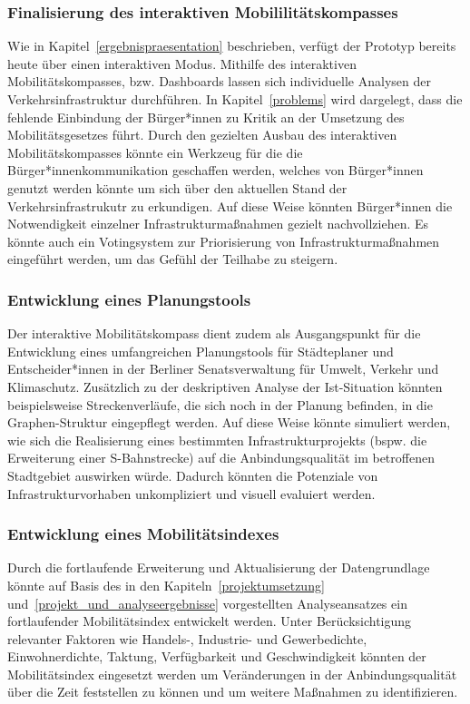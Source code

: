 \subsubsection{Finalisierung des interaktiven Mobililitätskompasses}
Wie in Kapitel~\ref{ergebnispraesentation} beschrieben, verfügt der Prototyp bereits heute über einen interaktiven Modus. Mithilfe des interaktiven Mobilitätskompasses, bzw. Dashboards lassen sich individuelle Analysen der Verkehrsinfrastruktur durchführen. In Kapitel~\ref{problems} wird dargelegt, dass die fehlende Einbindung der Bürger*innen zu Kritik an der Umsetzung des Mobilitätsgesetzes führt. Durch den gezielten Ausbau des interaktiven Mobilitätskompasses könnte ein Werkzeug für die die Bürger*innenkommunikation geschaffen werden, welches von Bürger*innen genutzt werden könnte um sich über den aktuellen Stand der Verkehrsinfrastrukutr zu erkundigen. Auf diese Weise könnten Bürger*innen die Notwendigkeit einzelner Infrastrukturmaßnahmen gezielt nachvollziehen. Es könnte auch ein Votingsystem zur Priorisierung von Infrastrukturmaßnahmen eingeführt werden, um das Gefühl der Teilhabe zu steigern.


\subsubsection{Entwicklung eines Planungstools}
Der interaktive Mobilitätskompass dient zudem als Ausgangspunkt für die Entwicklung eines umfangreichen Planungstools für Städteplaner und Entscheider*innen in der Berliner Senatsverwaltung für Umwelt, Verkehr und Klimaschutz. Zusätzlich zu der deskriptiven Analyse der Ist-Situation könnten beispielsweise Streckenverläufe, die sich noch in der Planung befinden, in die Graphen-Struktur eingepflegt werden. Auf diese Weise könnte simuliert werden, wie sich die Realisierung eines bestimmten Infrastrukturprojekts (bspw. die Erweiterung einer S-Bahnstrecke) auf die Anbindungsqualität im betroffenen Stadtgebiet auswirken würde. Dadurch könnten die Potenziale von Infrastrukturvorhaben unkompliziert und visuell evaluiert werden.

\subsubsection{Entwicklung eines Mobilitätsindexes}\label{mobwob_index}
Durch die fortlaufende Erweiterung und Aktualisierung der Datengrundlage könnte auf Basis des in den Kapiteln~\ref{projektumsetzung} und~\ref{projekt_und_analyseergebnisse} vorgestellten Analyseansatzes ein fortlaufender Mobilitätsindex entwickelt werden. Unter Berücksichtigung relevanter Faktoren wie Handels-, Industrie- und Gewerbedichte, Einwohnerdichte, Taktung, Verfügbarkeit und Geschwindigkeit könnten der Mobilitätsindex eingesetzt werden um Veränderungen in der Anbindungsqualität über die Zeit feststellen zu können und um weitere Maßnahmen zu identifizieren.

